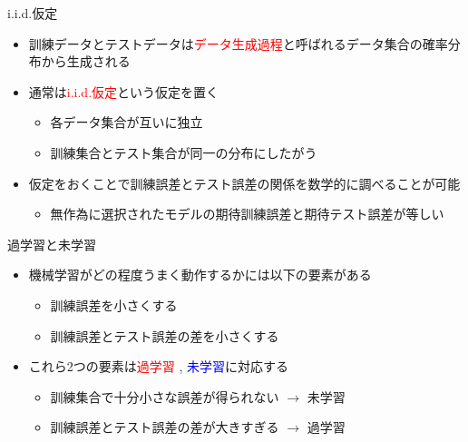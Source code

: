 \documentclass[dvipdfmx, 10pt]{beamer}
\begin{document}
\begin{frame}{i.i.d.仮定}
  \begin{itemize}
    \item 訓練データとテストデータは\textcolor{red}{データ生成過程}と呼ばれるデータ集合の確率分布から生成される
    \item 通常は\textcolor{red}{i.i.d.仮定}という仮定を置く
    \begin{itemize}
      \item 各データ集合が互いに独立
      \item 訓練集合とテスト集合が同一の分布にしたがう
    \end{itemize}
    \item 仮定をおくことで訓練誤差とテスト誤差の関係を数学的に調べることが可能
    \begin{itemize}
      \item 無作為に選択されたモデルの期待訓練誤差と期待テスト誤差が等しい
    \end{itemize}
  \end{itemize}
\end{frame}


\begin{frame}{過学習と未学習}
  \begin{itemize}
    \item 機械学習がどの程度うまく動作するかには以下の要素がある
    \begin{itemize}
      \item 訓練誤差を小さくする
      \item 訓練誤差とテスト誤差の差を小さくする
    \end{itemize}
    \item これら2つの要素は\textcolor{red}{過学習} , \textcolor{blue}{未学習}に対応する
    \begin{itemize}
      \item 訓練集合で十分小さな誤差が得られない $\to$ 未学習
      \item 訓練誤差とテスト誤差の差が大きすぎる $\to$ 過学習
    \end{itemize}
  \end{itemize}
\end{frame}

\end{document}
